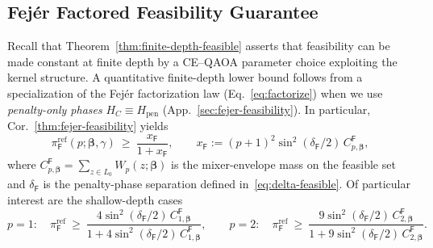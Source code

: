 \documentclass[a4paper,unpublished,onecolumn,11pt]{quantumarticle}
\theoremstyle{definition}
\theoremstyle{remark}
\begin{document}
\subsection{Fej\'er Factored Feasibility Guarantee}
\label{sec:fejfeas}
Recall that Theorem~\ref{thm:finite-depth-feasible}  asserts that feasibility can be made constant at finite depth by a CE--QAOA parameter choice exploiting the kernel structure. A quantitative finite-depth lower bound follows from a specialization of the Fej\'er factorization law
(Eq.~\ref{eq:factorize}) when we use \emph{penalty-only phases} $H_C\equiv H_{\mathrm{pen}}$ (App.~\ref{sec:fejer-feasibility}).  In particular, Cor.~\ref{thm:fejer-feasibility} yields
\[
\pi_{\mathsf F}^{\mathrm{ref}}(p;\boldsymbol\beta,\gamma)
\ \ge\
\frac{x_{\mathsf F}}{1+x_{\mathsf F}},
\qquad
x_{\mathsf F}:=(p+1)^2\sin^2(\delta_{\mathsf F}/2)\,C^{\mathsf F}_{p,\boldsymbol\beta},
\]
where $C^{\mathsf F}_{p,\boldsymbol\beta}=\sum_{z\in L_0}W_p(z;\boldsymbol\beta)$ is the mixer-envelope
mass on the feasible set and $\delta_{\mathsf F}$ is the penalty-phase separation
defined in~\eqref{eq:delta-feasible}. Of particular interest are the shallow-depth cases
\[
p=1:\quad \pi_{\mathsf F}^{\mathrm{ref}}\ \ge\ \frac{4\sin^2(\delta_{\mathsf F}/2)\,C^{\mathsf F}_{1,\boldsymbol\beta}}{1+4\sin^2(\delta_{\mathsf F}/2)\,C^{\mathsf F}_{1,\boldsymbol\beta}},
\qquad
p=2:\quad \pi_{\mathsf F}^{\mathrm{ref}}\ \ge\ \frac{9\sin^2(\delta_{\mathsf F}/2)\,C^{\mathsf F}_{2,\boldsymbol\beta}}{1+9\sin^2(\delta_{\mathsf F}/2)\,C^{\mathsf F}_{2,\boldsymbol\beta}}.
\]
\end{document}
